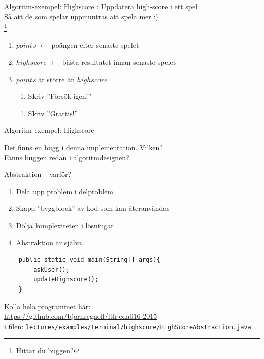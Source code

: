 \documentclass{lecturenotes}
\begin{document}
\begin{Slide}{Algoritm-exempel: Highscore}
: Uppdatera high-score i ett spel \\ \vspace{1em}
 Så att de som spelar uppmuntras att spela mer :) \\ \vspace{1em}
\footnote{Hittar du buggen?}
\begin{enumerate}
\item $points$ $\leftarrow$ poängen efter senaste spelet
\item $highscore$ $\leftarrow$ bästa resultatet innan senaste spelet
\item {} $points$ är större än $highscore$ 
\begin{enumerate}[ ~~]
\item  Skriv ''Försök igen!''
\end{enumerate}
\begin{enumerate}[ ~~]
\item  Skriv ''Grattis!''
\end{enumerate}
\end{enumerate}
\end{Slide}

\begin{Slide}{Algoritm-exempel: Highscore}

Det finns en bugg i denna implementation. Vilken? \\ Fanns buggen redan i algoritmdesignen?
\end{Slide}

\begin{Slide}{Abstraktion -- varför?}
\begin{enumerate}
\item Dela upp problem i delproblem
\item Skapa ''byggblock'' av kod som kan återanvändas
\item Dölja komplexiteten i lösningar
\item Abstraktion är själva 
\end{enumerate}
\begin{lstlisting}
    public static void main(String[] args){
    	askUser();
    	updateHighscore();
    }
\end{lstlisting}
Kolla hela programmet här:\\ \href{https://github.com/bjornregnell/lth-eda016-2015/blob/master/lectures/examples/terminal/highscore/HighScoreAbstraction.java}{https://github.com/bjornregnell/lth-eda016-2015} \\
i filen: \scriptsize\texttt{lectures/examples/terminal/highscore/HighScoreAbstraction.java}
\end{Slide}
\end{document}
